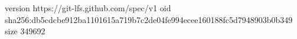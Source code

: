 version https://git-lfs.github.com/spec/v1
oid sha256:db5cdcbe912ba1101615a719b7c2de04fe994ecee160188fc5d7948903b0b349
size 349692
